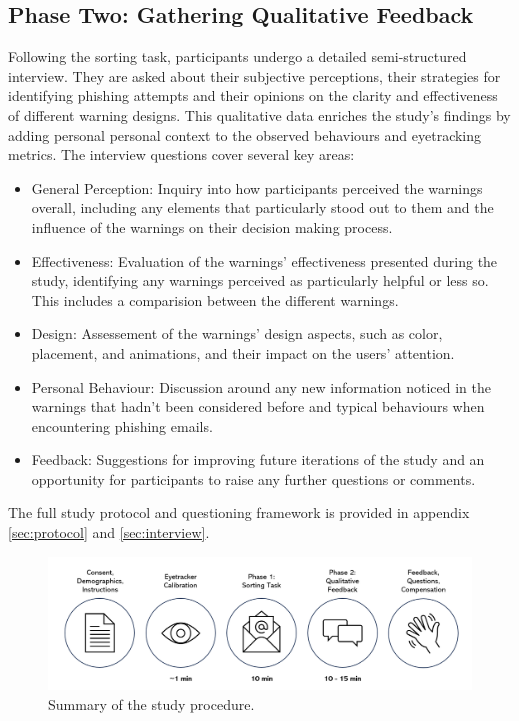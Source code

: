 \documentclass[
  a4paper,  %
  twoside,  %
  bibliography=totoc,
  headsepline,
  cleardoublepage=empty,
  parskip=half,
  draft=false
]{scrbook}
\begin{document}
\subsection{Phase Two: Gathering Qualitative Feedback}

Following the sorting task, participants undergo a detailed semi-structured interview. They are asked about their subjective perceptions, their strategies for identifying phishing attempts and their opinions on the clarity and effectiveness of different warning designs.
This qualitative data enriches the study’s findings by adding personal personal context to the observed behaviours and eyetracking metrics. The interview questions cover several key areas:

\begin{itemize}
    \item General Perception: Inquiry into how participants perceived the warnings overall, including any elements that particularly stood out to them and the influence of the warnings on their decision making process.
    \item Effectiveness: Evaluation of the warnings' effectiveness presented during the study, identifying any warnings perceived as particularly helpful or less so. This includes a comparision between the different warnings.
    \item Design: Assessement of the warnings' design aspects, such as color, placement, and animations, and their impact on the users' attention.
    \item Personal Behaviour: Discussion around any new information noticed in the warnings that hadn't been considered before and typical behaviours when encountering phishing emails.
    \item Feedback: Suggestions for improving future iterations of the study and an opportunity for participants to raise any further questions or comments. 
\end{itemize}
 
The full study protocol and questioning framework is provided in appendix \ref{sec:protocol} and \ref{sec:interview}.

\begin{figure} [ht]
    \centering
    \includegraphics[width=1\linewidth]{figures/studysteps.png}
    \caption{Summary of the study procedure.}
    \label{fig:steps}
\end{figure}
\end{document}
